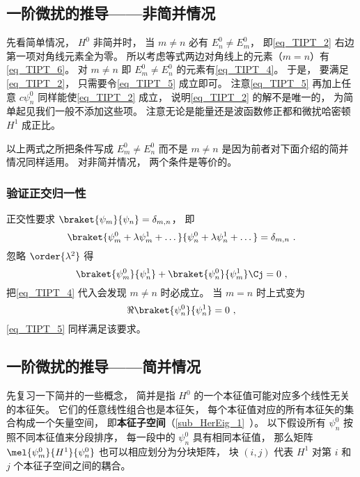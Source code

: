 \subsection{一阶微扰的推导——非简并情况}\label{sub_TIPT_1}
先看简单情况， $H^0$ 非简并时， 当 $m\ne n$ 必有 $E_n^0 \ne E_m^0$， 即\autoref{eq_TIPT_2} 右边第一项对角线元素全为零。 所以考虑等式两边对角线上的元素（$m = n$）有\autoref{eq_TIPT_6}。 对 $m \ne n$ 即 $E_m^0 \ne E_n^0$ 的元素有\autoref{eq_TIPT_4}。 于是， 要满足\autoref{eq_TIPT_2}， 只需要令\autoref{eq_TIPT_5} 成立即可。 注意\autoref{eq_TIPT_5} 再加上任意 $c \psi_n^0$ 同样能使\autoref{eq_TIPT_2} 成立， 说明\autoref{eq_TIPT_2} 的解不是唯一的， 为简单起见我们一般不添加这些项。 注意无论是能量还是波函数修正都和微扰哈密顿 $H^1$ 成正比。

以上两式之所把条件写成 $E_m^0 \ne E_n^0$ 而不是 $m \ne n$ 是因为前者对下面介绍的简并情况同样适用。 对非简并情况， 两个条件是等价的。

\subsubsection{验证正交归一性}
正交性要求 $\braket{\psi_m}{\psi_n} = \delta_{m,n}$， 即
\begin{equation}\label{eq_TIPT_7}
\braket{\psi_m^0 + \lambda \psi_m^1 + \dots}{\psi_n^0 + \lambda \psi_n^1 + \dots} = \delta_{m,n}~.
\end{equation}
忽略 $\order{\lambda^2}$ 得
\begin{equation}\label{eq_TIPT_8}
\braket{\psi_m^0}{\psi_n^1} + \braket{\psi_n^0}{\psi_m^1}\Cj = 0~,
\end{equation}
把\autoref{eq_TIPT_4} 代入会发现 $m \ne n$ 时必成立。 当 $m = n$ 时上式变为
\begin{equation}
\Re{\braket{\psi_n^0}{\psi_n^1}} = 0~,
\end{equation}
\autoref{eq_TIPT_5} 同样满足该要求。

\subsection{一阶微扰的推导——简并情况}
先复习一下简并的一些概念， 简并是指 $H^0$ 的一个本征值可能对应多个线性无关的本征矢。 它们的任意线性组合也是本征矢， 每个本征值对应的所有本征矢的集合构成一个矢量空间， 即\textbf{本征子空间}（\autoref{sub_HerEig_1}~）。 以下假设所有 $\psi_n^0$ 按照不同本征值来分段排序， 每一段中的 $\psi_n^0$ 具有相同本征值， 那么矩阵 $\mel{\psi_m^0}{H^1}{\psi_n^0}$ 也可以相应划分为分块矩阵， 块 $(i,j)$ 代表 $H^1$ 对第 $i$ 和 $j$ 个本征子空间之间的耦合。

